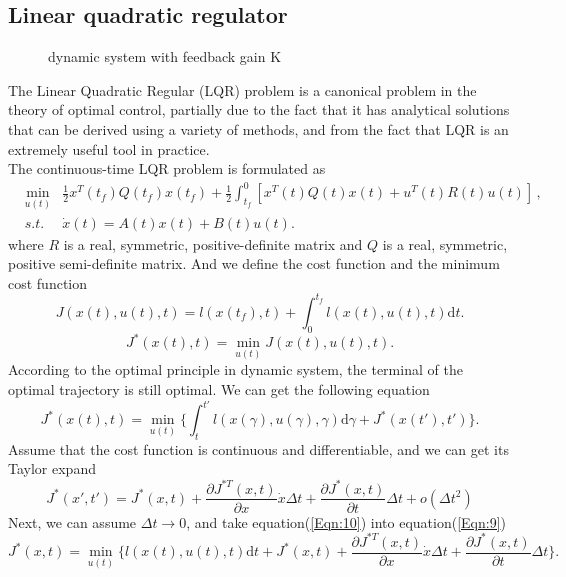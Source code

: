 \documentclass[a4paper,11pt]{article}
\begin{document}
\subsection{Linear quadratic regulator}
\begin{figure}[!htb]
	\centerline{
	}
	\caption{dynamic system with feedback gain K}
	\label{Figure:LQR}
\end{figure}
The Linear Quadratic Regular (LQR) problem is a canonical problem in the theory of optimal control, 
partially due to the fact that it has analytical solutions that can be derived using a variety of methods, 
and from the fact that LQR is an extremely useful tool in practice.\\
The continuous-time LQR problem is formulated as\cite{kamien2012dynamic}
\begin{eqnarray}	
	&\min_{u(t)}& {\frac{1}{2}x^{T}(t_f)Q(t_f)x(t_f)+\frac{1}{2}\int_{t_f}^{0}[x^{T}(t)Q(t)x(t)+u^{T}(t)R(t)u(t)]} \, , \nonumber \\ 
	&s.t.& \dot{x}(t) = A(t)x(t)+B(t)u(t). \label{Eqn:6}
\end{eqnarray}
where $R$ is a real, symmetric, positive-definite matrix and $Q$ is a real, symmetric, positive semi-definite matrix.
And we define the cost function and the minimum cost function
\begin{equation}
	J(x(t),u(t),t) = l(x(t_f),t)+\int_{0}^{t_f}l(x(t),u(t),t)\mathrm{d}t.	\label{Eqn:7}
\end{equation}
\begin{equation}
	J^*(x(t),t) = \min_{u(t)}{J(x(t),u(t),t)}.	\label{Eqn:8}
\end{equation}
According to the optimal principle in dynamic system, the terminal of the optimal trajectory is still optimal. We can get the following equation
\begin{equation}
	J^*(x(t),t) = \min_{u(t)}{\{\int_{t}^{t'} l(x(\gamma),u(\gamma),\gamma)\mathrm{d}\gamma+J^*(x(t'),t')\}}.	\label{Eqn:9}
\end{equation}
Assume that the cost function is continuous and differentiable, and we can get its Taylor expand
\begin{equation}
	J^*(x',t') = J^*(x,t)+\frac{\partial J^{*T}(x,t)}{\partial x}\dot{x}\Delta t + \frac{\partial J^*(x,t)}{\partial t}\Delta t + o(\Delta t^2) 	\label{Eqn:10}
\end{equation}
Next, we can assume $\Delta t \to 0$, and take equation(\ref{Eqn:10}) into equation(\ref{Eqn:9})
\begin{equation}
	J^*(x,t) = \min_{u(t)}{\{l(x(t),u(t),t)\mathrm{d}t+J^*(x,t)+\frac{\partial J^{*T}(x,t)}{\partial x}\dot{x}\Delta t + \frac{\partial J^*(x,t)}{\partial t}\Delta t\}}.	\label{Eqn:11}
\end{equation}
\end{document}
